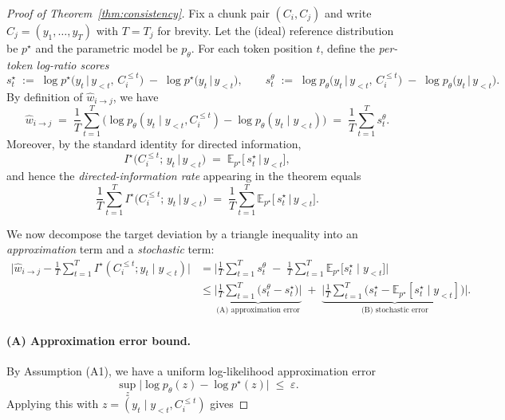 \documentclass{article} %
\theoremstyle{definition}
\newcommand{\EE}{\mathbb{E}}
\begin{document}
\begin{proof}[Proof of Theorem~\ref{thm:consistency}]
Fix a chunk pair $(C_i,C_j)$ and write $C_j=(y_{1},\dots,y_{T})$ with $T\!=\!T_j$ for brevity.
Let the (ideal) reference distribution be $p^\star$ and the parametric model be $p_\theta$.
For each token position $t$, define the \emph{per-token log-ratio scores}
\[
s_t^\star \;:=\; \log p^\star\!\big(y_t \,\big|\, y_{<t}\!,\, C_i^{\le t}\big)\;-\;\log p^\star\!\big(y_t \,\big|\, y_{<t}\big),
\qquad
s_t^\theta \;:=\; \log p_\theta\!\big(y_t \,\big|\, y_{<t}\!,\, C_i^{\le t}\big)\;-\;\log p_\theta\!\big(y_t \,\big|\, y_{<t}\big).
\]
By definition of $\hat{w}_{i\to j}$, we have
\[
\hat{w}_{i\to j}
\;=\;\frac{1}{T}\sum_{t=1}^{T}\big(\log p_\theta(y_t\mid y_{<t},C_i^{\le t})-\log p_\theta(y_t\mid y_{<t})\big)
\;=\;\frac{1}{T}\sum_{t=1}^{T} s_t^\theta.
\]
Moreover, by the standard identity for directed information\citep{massey1990causality},
\[
I^\star\!\big(C_i^{\le t};\,y_t \,\big|\, y_{<t}\big)
\;=\; \EE_{p^\star}\!\big[\, s_t^\star \,\big|\, y_{<t}\big],
\]
and hence the \emph{directed-information rate} appearing in the theorem equals
\[
\frac{1}{T}\sum_{t=1}^{T} I^\star\!\big(C_i^{\le t};\,y_t \,\big|\, y_{<t}\big)
\;=\; \frac{1}{T}\sum_{t=1}^{T} \EE_{p^\star}\!\big[\, s_t^\star \,\big|\, y_{<t}\big].
\]

We now decompose the target deviation by a triangle inequality into an \emph{approximation} term and a \emph{stochastic} term:
\begin{align*}
\bigg|\hat{w}_{i\to j} - \frac{1}{T}\sum_{t=1}^{T} I^\star(C_i^{\le t};y_t\mid y_{<t})\bigg|
&= \bigg|\frac{1}{T}\sum_{t=1}^{T} s_t^\theta \;-\; \frac{1}{T}\sum_{t=1}^{T} \EE_{p^\star}\!\big[ s_t^\star \mid y_{<t}\big]\bigg| \\
&\le \underbrace{\bigg|\frac{1}{T}\sum_{t=1}^{T} \big(s_t^\theta - s_t^\star\big)\bigg|}_{\text{(A) approximation error}}
\;+\; \underbrace{\bigg|\frac{1}{T}\sum_{t=1}^{T} \big(s_t^\star - \EE_{p^\star}[ s_t^\star \mid y_{<t}]\big)\bigg|}_{\text{(B) stochastic error}}.
\end{align*}

\paragraph{(A) Approximation error bound.}
By Assumption (A1), we have a uniform log-likelihood approximation error
\[
\sup_{z}\big|\log p_\theta(z) - \log p^\star(z)\big| \;\le\; \varepsilon.
\]
Applying this with $z=(y_t\mid y_{<t},C_i^{\le t})$ gives 


\end{proof}
\end{document}
